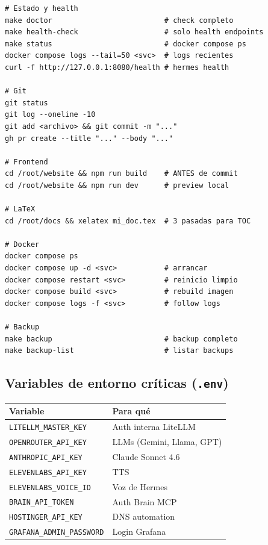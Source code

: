 \documentclass[11pt,a4paper]{article}
\begin{document}
\begin{lstlisting}[language=bashx]
# Estado y health
make doctor                          # check completo
make health-check                    # solo health endpoints
make status                          # docker compose ps
docker compose logs --tail=50 <svc>  # logs recientes
curl -f http://127.0.0.1:8080/health # hermes health

# Git
git status
git log --oneline -10
git add <archivo> && git commit -m "..."
gh pr create --title "..." --body "..."

# Frontend
cd /root/website && npm run build    # ANTES de commit
cd /root/website && npm run dev      # preview local

# LaTeX
cd /root/docs && xelatex mi_doc.tex  # 3 pasadas para TOC

# Docker
docker compose ps
docker compose up -d <svc>           # arrancar
docker compose restart <svc>         # reinicio limpio
docker compose build <svc>           # rebuild imagen
docker compose logs -f <svc>         # follow logs

# Backup
make backup                          # backup completo
make backup-list                     # listar backups
\end{lstlisting}

\subsection{Variables de entorno críticas (\texttt{.env})}

\begin{center}
\begin{tabularx}{0.95\textwidth}{|l|X|}
\hline
\rowcolor{manualgreen}\color{white}\textbf{Variable} & \color{white}\textbf{Para qué}\\
\hline
\texttt{LITELLM\_MASTER\_KEY} & Auth interna LiteLLM\\
\texttt{OPENROUTER\_API\_KEY} & LLMs (Gemini, Llama, GPT)\\
\texttt{ANTHROPIC\_API\_KEY} & Claude Sonnet 4.6\\
\texttt{ELEVENLABS\_API\_KEY} & TTS\\
\texttt{ELEVENLABS\_VOICE\_ID} & Voz de Hermes\\
\texttt{BRAIN\_API\_TOKEN} & Auth Brain MCP\\
\texttt{HOSTINGER\_API\_KEY} & DNS automation\\
\texttt{GRAFANA\_ADMIN\_PASSWORD} & Login Grafana\\
\hline
\end{tabularx}
\end{center}
\end{document}
